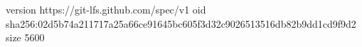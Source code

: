 version https://git-lfs.github.com/spec/v1
oid sha256:02d5b74a211717a25a66ce91645bc605f3d32c9026513516db82b9dd1cd9f9d2
size 5600
